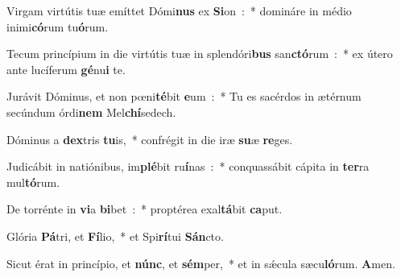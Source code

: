 ﻿\item Virgam virtútis tuæ emíttet Dómi\textbf{nus} ex \textbf{Si}\-on~:~* domináre in médio inimi\textbf{có}\-rum tu\textbf{ó}rum.
\item Tecum princípium in die virtútis tuæ in splen\-dó\-ri\-\textbf{bus} san\-\textbf{ctó}\-rum~:~* ex útero ante lucíferum \textbf{gé}\-nu\textbf{i} te.
\item Jurávit Dóminus, et non pœni\textbf{té}\-bit \textbf{e}\-um~:~* Tu es sacérdos in ætérnum secúndum órdi\textbf{nem} Mel\textbf{chí}sedech.
\item Dóminus a \textbf{dex}\-tris \textbf{tu}\-is,~* confrégit in die iræ \textbf{su}\-æ \textbf{re}ges.
\item Judicábit in natiónibus, im\textbf{plé}\-bit ru\textbf{í}\-nas~:~* con\-quas\-sá\-bit cápita in \textbf{ter}\-ra mul\textbf{tó}rum.
\item De torrénte in \textbf{vi}\-a \textbf{bi}\-bet~:~* proptérea exal\textbf{tá}\-bit \textbf{ca}put.
\item Glória \textbf{Pá}\-tri, et \textbf{Fí}\-lio,~* et Spi\textbf{rí}\-tui \textbf{Sán}cto.
\item Sicut érat in princípio, et \textbf{núnc}, et \textbf{sém}\-per,~* et in sǽ\-cu\-la sæ\-cu\-\textbf{ló}\-rum. \textbf{A}men.